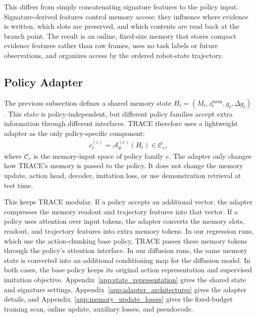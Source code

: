 \documentclass{article}
\begin{document}
This differs from simply concatenating signature features to the policy input. Signature-derived features control memory access: they influence where evidence is written, which slots are preserved, and which contents are read back at the branch point. The result is an online, fixed-size memory that stores compact evidence features rather than raw frames, uses no task labels or future observations, and organizes access by the ordered robot-state trajectory.

\subsection{Policy Adapter}
\label{sec:method_adapter}

The previous subsection defines a shared memory state
$H_t=(M_t,z_t^{\mathrm{mem}},g_t,\Delta g_t)$. This state is policy-independent, but different policy families accept extra information through different interfaces. TRACE therefore uses a lightweight adapter as the only policy-specific component:
\begin{align}
    c_t^{(e)}=\mathcal{A}_{\theta}^{(e)}(H_t)\in\mathcal{C}_e ,
\end{align}
where $\mathcal{C}_e$ is the memory-input space of policy family $e$. The adapter only changes how TRACE's memory is passed to the policy. It does not change the memory update, action head, decoder, imitation loss, or use demonstration retrieval at test time.

This keeps TRACE modular. If a policy accepts an additional vector, the adapter compresses the memory readout and trajectory features into that vector. If a policy uses attention over input tokens, the adapter converts the memory slots, readout, and trajectory features into extra memory tokens. In our regression runs, which use the action-chunking base policy, TRACE passes these memory tokens through the policy's attention interface. In our diffusion runs, the same memory state is converted into an additional conditioning map for the diffusion model. In both cases, the base policy keeps its original action representation and supervised imitation objective. Appendix~\ref{app:state_representation} gives the shared state and signature settings, Appendix~\ref{app:adapter_architectures} gives the adapter details, and Appendix~\ref{app:memory_update_losses} gives the fixed-budget training scan, online update, auxiliary losses, and pseudocode.

\end{document}

